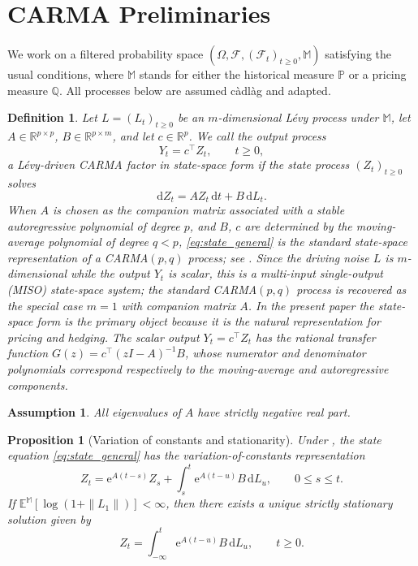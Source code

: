 \documentclass[10pt,a4paper,reqno]{amsart}
\newtheorem{proposition}[theorem]{Proposition}
\newtheorem{definition}[theorem]{Definition}
\newtheorem{assumption}[theorem]{Assumption}
\newcommand{\R}{\mathbb{R}}
\newcommand{\Q}{\mathbb{Q}}
\newcommand{\PP}{\mathbb{P}}
\newcommand{\F}{\mathcal{F}}
\newcommand{\1}{\mathbbm{1}}
\newcommand{\dd}{\mathrm{d}}
\newcommand{\ee}{\mathrm{e}}
\begin{document}
\section{CARMA Preliminaries}\label{sec:carma-preliminaries}

We work on a filtered probability space
\((\Omega,\F,(\F_t)_{t \ge 0},\mathbb{M})\) satisfying the usual conditions,
where \(\mathbb{M}\) stands for either the historical measure \(\PP\) or a
pricing measure \(\Q\). All processes below are assumed càdlàg and adapted.

\begin{definition}\label{def:carma-factor}
Let \(L=(L_t)_{t \ge 0}\) be an \(m\)-dimensional Lévy process under
\(\mathbb{M}\), let \(A \in \R^{p \times p}\), \(B \in \R^{p \times m}\), and
let \(c \in \R^p\). We call the output process
\[
Y_t = c^\top Z_t,\qquad t \ge 0,
\]
a \emph{Lévy-driven CARMA factor in state-space form} if the state process
\((Z_t)_{t \ge 0}\) solves
\begin{equation}\label{eq:state_general}
  \dd Z_t = A Z_t\,\dd t + B\,\dd L_t.
\end{equation}
When \(A\) is chosen as the companion matrix associated with a stable
autoregressive polynomial of degree \(p\), and \(B\), \(c\) are determined by
the moving-average polynomial of degree \(q < p\),
\eqref{eq:state_general} is the standard state-space
representation of a CARMA\((p,q)\) process; see \citet{Bro01}. Since the driving
noise \(L\) is \(m\)-dimensional while the output \(Y_t\) is scalar, this is a
\emph{multi-input single-output} (MISO) state-space system; the standard
CARMA\((p,q)\) process is recovered as the special case \(m=1\) with companion
matrix \(A\). In the present paper the state-space form is the primary object
because it is the natural representation for pricing and hedging. The scalar
output \(Y_t = c^\top Z_t\) has the rational transfer function
\(G(z) = c^\top(zI-A)^{-1}B\), whose numerator and denominator polynomials
correspond respectively to the moving-average and autoregressive components.
\end{definition}

\begin{assumption}\label{ass:stableA}
All eigenvalues of \(A\) have strictly negative real part.
\end{assumption}

\begin{proposition}[Variation of constants and stationarity]
\label{prop:variation_constants}
Under , the state equation \eqref{eq:state_general} has the
variation-of-constants representation
\begin{equation}\label{eq:variation_constants}
  Z_t = \ee^{A(t-s)} Z_s + \int_s^t \ee^{A(t-u)} B\,\dd L_u,
  \qquad 0 \le s \le t.
\end{equation}
If \(\mathbb{E}^{\mathbb{M}}[\log(1+\|L_1\|)] < \infty\), then there exists a
unique strictly stationary solution given by
\begin{equation}\label{eq:stationary_solution}
  Z_t = \int_{-\infty}^t \ee^{A(t-u)} B\,\dd L_u,
  \qquad t \ge 0.
\end{equation}
\end{proposition}
\end{document}
